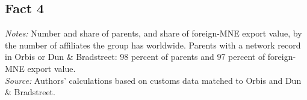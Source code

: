 \documentclass[11pt,a4paper]{article}
\begin{document}
\subsection*{Fact 4}
\begin{table}[H]\centering\small%
  \caption{Foreign-Multinational Exports and Number of Parents, by Size of the Group's Global Network}%
  \label{tab:a_f5_tab}%
  \par\vspace{3pt}%
  \begin{minipage}{0.95\textwidth}\footnotesize %
  \textit{Notes:} Number and share of parents, and share of foreign-MNE export value, by the number of affiliates the group has worldwide. Parents with a network record in Orbis or Dun \& Bradstreet: 98 percent of parents and 97 percent of foreign-MNE export value.\\[3pt]%
  \textit{Source:} Authors' calculations based on customs data matched to Orbis and Dun \& Bradstreet.%
  \end{minipage}%
  \end{table}
\end{document}
